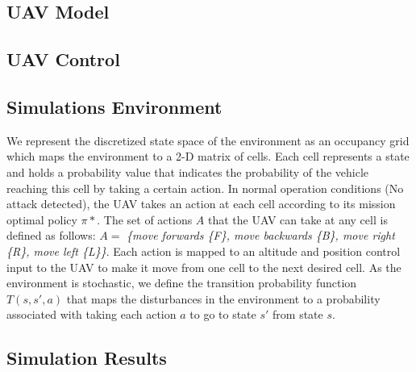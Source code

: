 \documentclass[letterpaper, 10 pt, conference]{ieeeconf}  %
\begin{document}
\subsection{UAV Model}
\subsection{UAV Control}
\subsection{Simulations Environment}
 We represent the discretized state space of the environment as an occupancy grid which maps the environment to a 2-D matrix of cells. Each cell represents a state and holds a probability value that indicates the probability of the vehicle reaching this cell by taking a certain action.
In normal operation conditions (No attack detected), the UAV takes an action at each cell according to its mission optimal policy $\pi*$. The set of actions $A$ that the UAV can take at any cell is defined as follows:
$A =$ \textit{\{move forwards \{F\}, move backwards \{B\}, move right \{R\}, move left \{L\}\}}.
Each action is mapped to an altitude and position control input to the UAV to make it move from one cell to the next desired cell. As the environment is stochastic, we define the transition probability function $T(s,s',a)$ that maps the disturbances in the environment to a probability associated with taking each action $a$ to go to state $s'$ from state $s$.
\subsection{Simulation Results}
\end{document}
